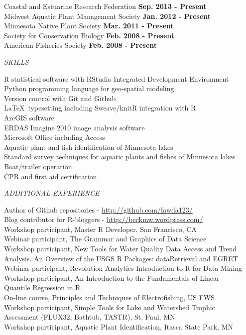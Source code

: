 \documentclass[letterpaper,12pt]{article}
\newcommand{\sectitle}[1]{\vspace{\baselineskip} \centerline{\large{\textit{#1}}}}
\begin{document}
Coastal and Estuarine Research Federation \hfill {\bf Sep. 2013 - Present} \\
Midwest Aquatic Plant Management Society \hfill {\bf Jan. 2012 - Present} \\
Minnesota Native Plant Society \hfill {\bf Mar. 2011 - Present} \\
Society for Conservation Biology \hfill {\bf Feb. 2008 - Present} \\
American Fisheries Society \hfill {\bf Feb. 2008 - Present}

\sectitle{SKILLS}

R statistical software with RStudio Integrated Development Environment \\
Python programming language for geo-spatial modeling \\
Version control with Git and Github \\
\LaTeX\ typesetting including Sweave/knitR integration with R \\
ArcGIS software\\
ERDAS Imagine 2010 image analysis software \\
Microsoft Office including Access \\
Aquatic plant and fish identification of Minnesota lakes \\
Standard survey techniques for aquatic plants and fishes of Minnesota lakes \\
Boat/trailer operation \\
CPR and first aid certification

\sectitle{ADDITIONAL EXPERIENCE}

Author of Github repositories - \url{http://github.com/fawda123/} \\
Blog contributor for R-bloggers - \url{http://beckmw.wordpress.com/} \\
Workshop participant, Master R Developer, San Francisco, CA \\
Webinar participant, The Grammar and Graphics of Data Science \\
Workshop participant, New Tools for Water Quality Data Access and Trend \\ \hspace{0.3in} Analysis. An Overview of the USGS R Packages: dataRetrieval and EGRET\\
Webinar participant, Revolution Analytics Introduction to R for Data Mining \\
Workshop participant, An Introduction to the Fundamentals of Linear \\
\hspace{0.3in}Quantile Regression in R \\
On-line course, Principles and Techniques of Electrofishing, US FWS \\
Workshop participant, Simple Tools for Lake and Watershed Trophic \\
\hspace{0.3in}Assessment (FLUX32, Bathtub, TASTR), St. Paul, MN \\
Workshop participant, Aquatic Plant Identification, Itasca State Park, MN 
\end{document}
